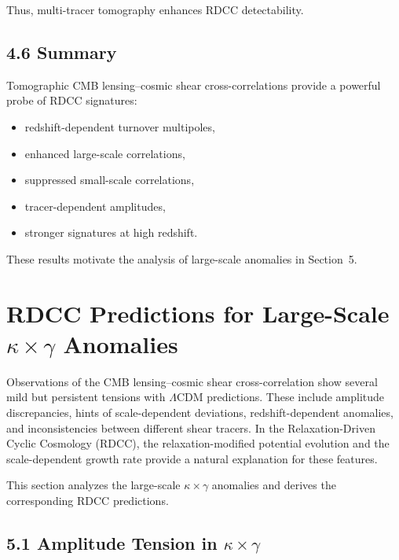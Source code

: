\documentclass[11pt,a4paper]{article}
\begin{document}
Thus, multi-tracer tomography enhances RDCC detectability.

\subsection*{4.6 Summary}

Tomographic CMB lensing--cosmic shear cross-correlations provide a powerful probe of RDCC 
signatures:

\begin{itemize}
    \item redshift-dependent turnover multipoles,
    \item enhanced large-scale correlations,
    \item suppressed small-scale correlations,
    \item tracer-dependent amplitudes,
    \item stronger signatures at high redshift.
\end{itemize}

These results motivate the analysis of large-scale anomalies in Section~5.

\section{RDCC Predictions for Large-Scale \texorpdfstring{$\kappa \times \gamma$}{κ × γ} Anomalies}

Observations of the CMB lensing--cosmic shear cross-correlation show several mild but 
persistent tensions with $\Lambda$CDM predictions. These include amplitude discrepancies, 
hints of scale-dependent deviations, redshift-dependent anomalies, and inconsistencies 
between different shear tracers. In the Relaxation-Driven Cyclic Cosmology (RDCC), the 
relaxation-modified potential evolution and the scale-dependent growth rate provide a 
natural explanation for these features.

This section analyzes the large-scale $\kappa \times \gamma$ anomalies and derives the 
corresponding RDCC predictions.

\subsection*{5.1 Amplitude Tension in $\kappa \times \gamma$}
\end{document}
